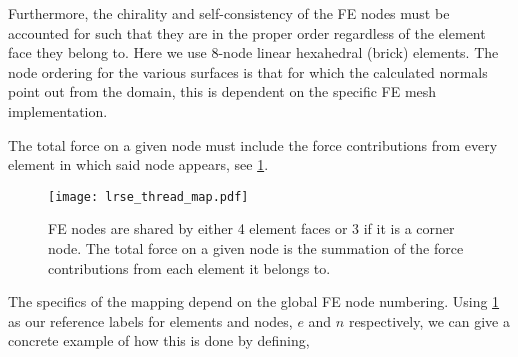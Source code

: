 Furthermore, the chirality and self-consistency of the FE nodes must be accounted for such that they are in the proper order regardless of the element face they belong to. Here we use 8-node linear hexahedral (brick) elements. The node ordering for the various surfaces is that for which the calculated normals point out from the domain, this is dependent on the specific FE mesh implementation.

The total force on a given node must include the force contributions from every element in which said node appears, see \cref{f:shared_node}.
\begin{figure}
    \centering
    \texttt{[image: lrse\_thread\_map.pdf]}
    \caption[FE nodes are shared between surface elements.]{FE nodes are shared by either 4 element faces or 3 if it is a corner node. The total force on a given node is the summation of the force contributions from each element it belongs to.}
    \label{f:shared_node}
\end{figure}
The specifics of the mapping depend on the global FE node numbering. Using \cref{f:shared_node} as our reference labels for elements and nodes, $e$ and $n$ respectively, we can give a concrete example of how this is done by defining,
